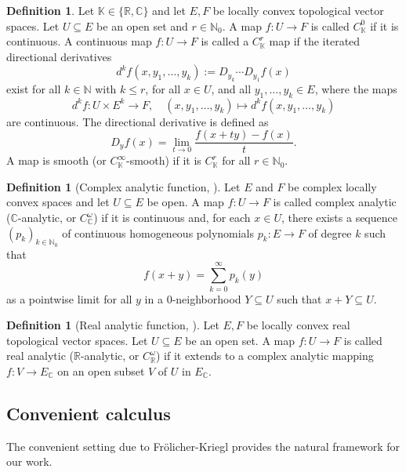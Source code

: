 \documentclass[11pt,reqno]{amsart}
\theoremstyle{definition}
\newtheorem{definition}[theorem]{Definition}
\numberwithin{equation}{section}
\begin{document}
\begin{definition}
Let $\mathbb{K} \in \{\mathbb{R}, \mathbb{C}\}$ and let $E, F$ be locally convex topological vector spaces. Let $U \subseteq E$ be an open set and $r \in \mathbb{N}_{0}$. A map $f: U \rightarrow F$ is called $C_{\mathbb{K}}^{0}$ if it is continuous. A continuous map $f: U \rightarrow F$ is called a $C_{\mathbb{K}}^{r}$ map if the iterated directional derivatives
\[
d^{k}f(x, y_{1}, \dots, y_{k}) := D_{y_{k}} \cdots D_{y_{1}}f(x)
\]
exist for all $k \in \mathbb{N}$ with $k \le r$, for all $x \in U$, and all $y_{1}, \dots, y_{k} \in E$, where the maps
\[
d^{k}f: U \times E^{k} \rightarrow F, \quad (x, y_{1}, \dots, y_{k}) \mapsto d^{k}f(x, y_{1}, \dots, y_{k})
\]
are continuous. The directional derivative is defined as
\[
D_{y}f(x) = \lim_{t \rightarrow 0} \frac{f(x+ty) - f(x)}{t}.
\]
A map is smooth (or $C_{\mathbb{K}}^{\infty}$-smooth) if it is $C_{\mathbb{K}}^{r}$ for all $r \in \mathbb{N}_{0}$.
\end{definition}

\begin{definition}[Complex analytic function, \cite{11}]
Let $E$ and $F$ be complex locally convex spaces and let $U\subseteq E$ be open. A map $f: U \to F$ is called complex analytic ($\mathbb{C}$-analytic, or $C^\omega_{\mathbb{C}}$) if it is continuous and, for each $x \in U$, there exists a sequence $(p_k)_{k\in \mathbb{N}_0}$ of continuous homogeneous polynomials $p_k: E \to F$ of degree $k$ such that
\[
f(x+ y) = \sum_{k=0}^{\infty}p_k(y)
\] 
as a pointwise limit for all $y$ in a $0$-neighborhood $Y\subseteq U$ such that $x+ Y\subseteq U$.
\end{definition}

\begin{definition}[Real analytic function, \cite{11}]
Let $E, F$ be locally convex real topological vector spaces. Let $U \subseteq E$ be an open set. A map $f: U \rightarrow F$ is called real analytic ($\mathbb{R}$-analytic, or $C^\omega_{\mathbb{R}}$) if it extends to a complex analytic mapping $f: V\to E_{\mathbb{C}}$ on an open subset $V$ of $U$ in $E_{\mathbb{C}}$.
\end{definition}

\subsection{Convenient calculus}
The convenient setting due to Frölicher-Kriegl \cite{20} provides the natural framework for our work.
\end{document}
